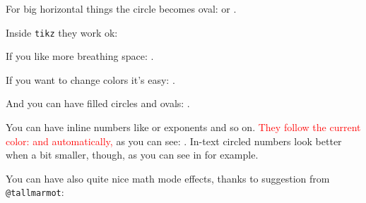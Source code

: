 \documentclass{ltxdoc}
\begin{document}
\begin{LTXexample}
For big horizontal things the circle becomes oval:  or .
\end{LTXexample}


\begin{LTXexample}
Inside \texttt{tikz} they work ok:

\tikzset{/csteps/outer color=green!30!black}
\end{LTXexample}


\begin{LTXexample}
If you like more breathing space:
     .
\par\bigskip
\end{LTXexample}

\begin{LTXexample}
If you want to change colors it's easy:
     .
\par\bigskip
\end{LTXexample}

\begin{LTXexample}
And you can have filled circles and ovals:
 .
\par\bigskip
\end{LTXexample}


\begin{LTXexample}
You can have inline numbers like  or
exponents\textsuperscript{} and so on.
\textcolor{red}{They follow the current color:   and  automatically,} as you can see:  . In-text circled numbers look better when a bit smaller, though, as you can see in {\small{}} for example.
\end{LTXexample}

You can have also quite nice math mode effects, thanks to suggestion from \texttt{@tallmarmot}:
\end{document}
